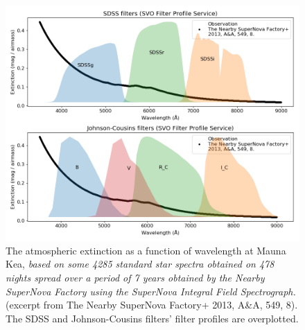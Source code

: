 \begin{figure}[ht!]
\centering
\includegraphics[width=0.9\linewidth]{figs/air-ext-and-filter}
\caption{The atmospheric extinction as a function of wavelength at Mauna Kea, \textit{based on some 4285 standard star spectra obtained on 478 nights spread over a period of 7 years obtained by the Nearby SuperNova Factory using the SuperNova Integral Field Spectrograph.} (excerpt from The Nearby SuperNova Factory+ 2013, A\&A, 549, 8). The SDSS and Johnson-Cousins filters' filter profiles are overplotted.}
\label{fig:air-ext-and-filter}
\end{figure}

